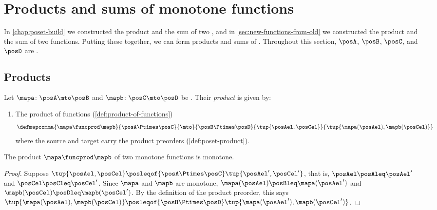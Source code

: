 

\section{Products and sums of monotone functions}
\label{sec:monotone-products-sums}

In \cref{chap:poset-build} we constructed the product and the sum of two , and in \cref{sec:new-functions-from-old} we constructed the product and the sum of two functions.
Putting these together, we can form products and sums of .
Throughout this section, $\posA$, $\posB$, $\posC$, and $\posD$ are .

\subsection{Products}

\begin{ctdefinition}
    \label{def:monotone-product}
    Let $\mapa \colon \posA \mto \posB$ and $\mapb \colon \posC \mto \posD$ be .
    Their \emph{product} is given by:

    \constit
    \begin{enumerate}
        \item The product of functions (\cref{def:product-of-functions})
              \begin{equation}
                  \defmapcomma{
                      \mapa \funcprod \mapb
                  }{
                      \posA \Ptimes \posC
                  }{
                      \mto
                  }{
                      \posB \Ptimes \posD
                  }{
                      \tup{\posAel, \posCel}
                  }{
                      \tup{\mapa(\posAel), \mapb(\posCel)}
                  }
              \end{equation}
              where the source and target carry the product preorders (\cref{def:poset-product}).
    \end{enumerate}
\end{ctdefinition}

\begin{lemma}
    \label{lem:monotone-product}
    The product $\mapa \funcprod \mapb$ of two monotone functions is monotone.
\end{lemma}
\begin{proof}
    Suppose $\tup{\posAel, \posCel} \posleqof{\posA \Ptimes \posC} \tup{\posAel', \posCel'}$, that is, $\posAel \posAleq \posAel'$ and $\posCel \posCleq \posCel'$.
    Since $\mapa$ and $\mapb$ are monotone, $\mapa(\posAel) \posBleq \mapa(\posAel')$ and $\mapb(\posCel) \posDleq \mapb(\posCel')$.
    By the definition of the product preorder, this says $\tup{\mapa(\posAel), \mapb(\posCel)} \posleqof{\posB \Ptimes \posD} \tup{\mapa(\posAel'), \mapb(\posCel')}$.
\end{proof}


